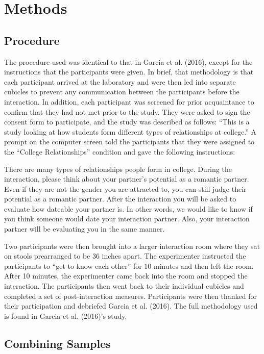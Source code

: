 \documentclass[man]{apa6}
\begin{document}
\section{Methods}\label{methods}

\subsection{Procedure}\label{procedure}

The procedure used was identical to that in Garcia et al. (2016), except
for the instructions that the participants were given. In brief, that
methodology is that each participant arrived at the laboratory and were
then led into separate cubicles to prevent any communication between the
participants before the interaction. In addition, each participant was
screened for prior acquaintance to confirm that they had not met prior
to the study. They were asked to sign the consent form to participate,
and the study was described as follows: \enquote{This is a study looking
at how students form different types of relationships at college.} A
prompt on the computer screen told the participants that they were
assigned to the \enquote{College Relationships} condition and gave the
following instructions:

There are many types of relationships people form in college. During the
interaction, please think about your partner's potential as a romantic
partner. Even if they are not the gender you are attracted to, you can
still judge their potential as a romantic partner. After the interaction
you will be asked to evaluate how dateable your partner is. In other
words, we would like to know if you think someone would date your
interaction partner. Also, your interaction partner will be evaluating
you in the same manner.

Two participants were then brought into a larger interaction room where
they sat on stools prearranged to be 36 inches apart. The experimenter
instructed the participants to \enquote{get to know each other} for 10
minutes and then left the room. After 10 minutes, the experimenter came
back into the room and stopped the interaction. The participants then
went back to their individual cubicles and completed a set of
post-interaction measures. Participants were then thanked for their
participation and debriefed Garcia et al. (2016). The full methodology
used is found in Garcia et al. (2016)'s study.

\subsection{Combining Samples}\label{combining-samples}
\end{document}
